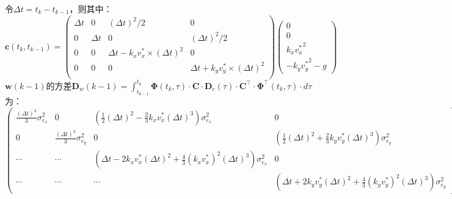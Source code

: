\documentclass[12pt, onecolumn]{article}
\begin{document}
	令$\Delta t=t_k-t_{k-1}$，则其中：
	\begin{equation}
	\boldsymbol{c}(t_k,t_{k-1})=	\begin{pmatrix}
		\Delta t&0&(\Delta t)^2/2&0\\
		0&\Delta t&0&(\Delta t)^2/2\\
		0&0&\Delta t-k_x v_x^*\times(\Delta t)^2&0\\
		0&0&0&\Delta t+k_y v_y^*\times(\Delta t)^2\\
		\end{pmatrix}\begin{pmatrix}
		0\\0\\
		k_x{v_x^*}^2\\
		-k_y{v_y^*}^2-g
		\end{pmatrix}
	\end{equation}
	$\boldsymbol{w}(k-1)$的方差$\boldsymbol{D}_{w}(k-1)=\int_{t_{k-1}}^{t_k}\boldsymbol{\Phi}(t_k,\tau)\cdot\boldsymbol{C}\cdot\boldsymbol{D}_{e}(\tau)\cdot\boldsymbol{C}^\top\cdot\boldsymbol{\Phi}^\top(t_k,\tau)\cdot d\tau$为：
	\begin{equation}
	\begin{pmatrix}
	\frac{(\Delta t)^3}{3}\sigma_{e_x}^2
	&0&
	\left( \frac{1}{2}(\Delta t)^2-\frac{2}{3}k_xv_x^*(\Delta t)^3\right)\sigma_{e_x}^2 
	&0\\
	0&
	\frac{(\Delta t)^3}{3}\sigma_{e_y}^2
	&0&
	\left( \frac{1}{2}(\Delta t)^2+\frac{2}{3}k_yv_y^*(\Delta t)^3\right)\sigma_{e_y}^2 
	\\
	\cdots&\cdots&
	\left(\Delta t-2k_xv_x^*(\Delta t)^2+\frac{4}{3}(k_xv^*_x)^2(\Delta t)^3 \right) \sigma_{e_x}^2
	&0
	\\
	\cdots&\cdots&\cdots&
	\left(\Delta t+2k_yv_y^*(\Delta t)^2+\frac{4}{3}(k_yv^*_y)^2(\Delta t)^3 \right) \sigma_{e_y}^2
	\end{pmatrix}
	\end{equation}
\end{document}
